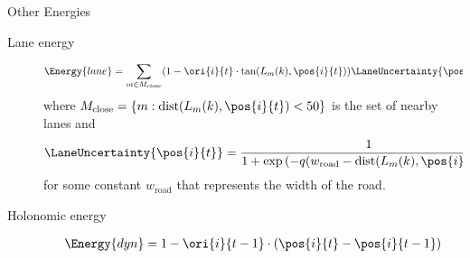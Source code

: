 \documentclass[handout,final]{beamer}
\newlength{\onecolwid}
\begin{document}
\begin{frame}[t]
\begin{columns}[t]
\begin{column}{\onecolwid}



      \begin{block}{Other Energies}
        \begin{description}
          \item[Lane energy]
            \begin{multline}
              \label{eq:laneOrientationEnergy}
              \Energy{lane} = 
              \sum_{m \in M_{\text{close}}}
              (1 - \ori{i}{t} \cdot \text{tan}(L_{m}(k), \pos{i}{t}) )
              \LaneUncertainty{\pos{i}{t}}
            \end{multline}
            where $M_{\text{close}} = \{m : \text{dist}(L_{m}(k), \pos{i}{t}) < 50\} $ is
            the set of nearby lanes and 
            \begin{multline}
              \LaneUncertainty{\pos{i}{t}} = 
              \frac{1}{1 + \exp{(-q(w_{\text{road}} - \text{dist}(L_{m}(k), \pos{i}{t})))}}
            \end{multline}
            for some constant $w_{\text{road}}$ that represents the width of the road.

          \item[Holonomic energy]
            \begin{align}
              \label{eq:totalPosTransitionEnergy}
              \Energy{dyn} = 1 - \ori{i}{t-1} \cdot (\pos{i}{t} - \pos{i}{t-1})
            \end{align}





\end{description}
\end{block}
\end{column}
\end{columns}
\end{frame}
\end{document}

